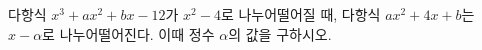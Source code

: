다항식 $x^3+ax^2+bx-12$가 $x^2-4$로 나누어떨어질 때, 다항식 $ax^2+4x+b$는 $x-\alpha$로 나누어떨어진다. 이때 정수 $\alpha$의 값을 구하시오. 
